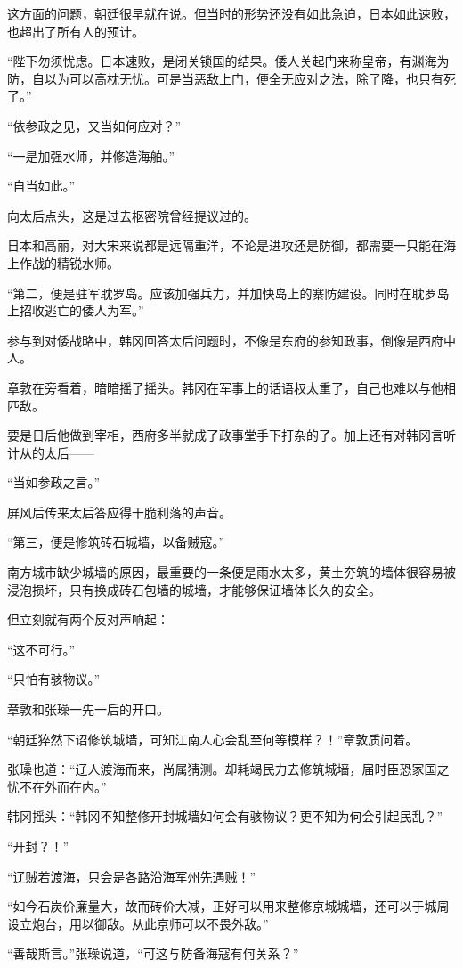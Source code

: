 这方面的问题，朝廷很早就在说。但当时的形势还没有如此急迫，日本如此速败，也超出了所有人的预计。

“陛下勿须忧虑。日本速败，是闭关锁国的结果。倭人关起门来称皇帝，有渊海为防，自以为可以高枕无忧。可是当恶敌上门，便全无应对之法，除了降，也只有死了。”

“依参政之见，又当如何应对？”

“一是加强水师，并修造海舶。”

“自当如此。”

向太后点头，这是过去枢密院曾经提议过的。

日本和高丽，对大宋来说都是远隔重洋，不论是进攻还是防御，都需要一只能在海上作战的精锐水师。

“第二，便是驻军耽罗岛。应该加强兵力，并加快岛上的寨防建设。同时在耽罗岛上招收逃亡的倭人为军。”

参与到对倭战略中，韩冈回答太后问题时，不像是东府的参知政事，倒像是西府中人。

章敦在旁看着，暗暗摇了摇头。韩冈在军事上的话语权太重了，自己也难以与他相匹敌。

要是日后他做到宰相，西府多半就成了政事堂手下打杂的了。加上还有对韩冈言听计从的太后——

“当如参政之言。”

屏风后传来太后答应得干脆利落的声音。

“第三，便是修筑砖石城墙，以备贼寇。”

南方城市缺少城墙的原因，最重要的一条便是雨水太多，黄土夯筑的墙体很容易被浸泡损坏，只有换成砖石包墙的城墙，才能够保证墙体长久的安全。

但立刻就有两个反对声响起：

“这不可行。”

“只怕有骇物议。”

章敦和张璪一先一后的开口。

“朝廷猝然下诏修筑城墙，可知江南人心会乱至何等模样？！”章敦质问着。

张璪也道：“辽人渡海而来，尚属猜测。却耗竭民力去修筑城墙，届时臣恐家国之忧不在外而在内。”

韩冈摇头：“韩冈不知整修开封城墙如何会有骇物议？更不知为何会引起民乱？”

“开封？！”

“辽贼若渡海，只会是各路沿海军州先遇贼！”

“如今石炭价廉量大，故而砖价大减，正好可以用来整修京城城墙，还可以于城周设立炮台，用以御敌。从此京师可以不畏外敌。”

“善哉斯言。”张璪说道，“可这与防备海寇有何关系？”

